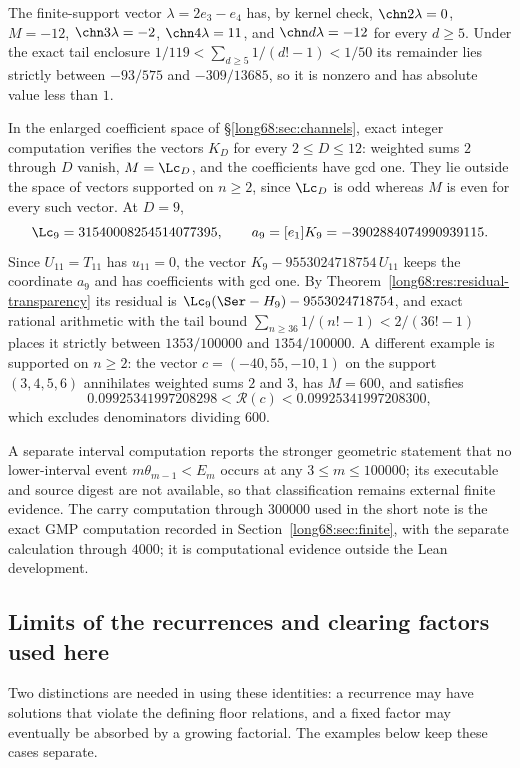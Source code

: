The finite-support vector $\lambda=2e_3-e_4$ has, by kernel check,
$\chn2\lambda=0$, $M=-12$, $\chn3\lambda=-2$,
$\chn4\lambda=11$, and $\chn d\lambda=-12$ for every $d\ge5$.  Under the
exact tail enclosure
$1/119<\sum_{d\ge5}1/(d!-1)<1/50$ its remainder lies
strictly between $-93/575$ and $-309/13685$, so it is nonzero and has
absolute value less than $1$.

In the enlarged coefficient space of \S\ref{long68:sec:channels}, exact
integer computation verifies the vectors $K_D$ for every $2\le D\le12$:
weighted sums $2$ through $D$ vanish, $M=\Lc_D$, and the
coefficients have gcd one.  They lie outside the space of vectors supported
on $n\ge2$, since $\Lc_D$ is odd whereas $M$ is even for every such vector.  At
$D=9$,
\[
 \Lc_9=31540008254514077395,\qquad a_9=[e_1]K_9=-3902884074990939115 .
\]
Since $U_{11}=T_{11}$ has $u_{11}=0$, the vector $K_9-9553024718754\,U_{11}$
keeps the coordinate $a_9$ and has coefficients with gcd one.  By
Theorem~\ref{long68:res:residual-transparency} its residual is
$\Lc_9(\Ser-H_9)-9553024718754$, and exact rational arithmetic with the tail
bound $\sum_{n\ge36}1/(n!-1)<2/(36!-1)$ places it strictly between
$1353/100000$ and $1354/100000$.  A different example is supported on
$n\ge2$: the vector $c=(-40,55,-10,1)$ on the support $(3,4,5,6)$ annihilates
weighted sums $2$ and $3$, has $M=600$, and satisfies
\[
 0.09925341997208298<\mathcal R(c)<0.09925341997208300 ,
\]
which excludes denominators dividing $600$.

A separate interval computation reports the stronger geometric statement that no
lower-interval event $m\theta_{m-1}<E_m$ occurs at any $3\le m\le100000$; its executable and source
digest are not available, so that classification remains external finite
evidence.  The carry computation through $300000$ used in the short note is the
exact GMP computation recorded in Section~\ref{long68:sec:finite}, with
the separate calculation through $4000$; it is computational evidence
outside the Lean development.

\subsection{Limits of the recurrences and clearing factors used here}\label{long68:sec:ext-nogo}

Two distinctions are needed in using these identities: a recurrence
may have solutions that violate the defining floor relations, and a
fixed factor may eventually be absorbed by a growing factorial. The
examples below keep these cases separate.

